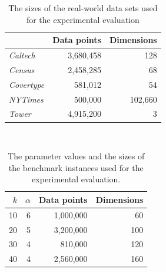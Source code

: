%
\begin{table}
	\begin{center}%
	\caption{The sizes of the real-world data sets used for the experimental evaluation}
	\label{tab:real-world-datasets-overview}
	\begin{tabular}{lrr}
		\toprule
        
		    & Data points
		    & Dimensions
            \\
		\midrule
		\textit{Caltech}
    		& 3,680,458
    		& 128
    		\\
		\textit{Census}
    		& 2,458,285
    		& 68
    		\\
	    \textit{Covertype}
    	    & 581,012
    		& 54
    		\\
	    \textit{NYTimes}
    	    & 500,000
    		& 102,660
    		\\
        \textit{Tower}
            & 4,915,200
    		& 3
    		\\
		\bottomrule
	\end{tabular}\\
	\end{center}
\end{table}



%
\begin{table}
	\begin{center}%
	\caption{The parameter values and the sizes of the benchmark instances used for the experimental evaluation.}
	\label{tab:benchmark-instances-overview}
	\begin{tabular}{rrrr}
		\toprule
        $k$
		    & $\alpha$
		    & Data points
		    & Dimensions
            \\
		\midrule
        10
    		& 6
    		& 1,000,000
    		& 60
    		\\
        20
    		& 5
    		& 3,200,000
    		& 100
    		\\
        30
    		& 4
    		& 810,000
    		& 120
    		\\
        40
    		& 4
    		& 2,560,000
    		& 160
    		\\
		\bottomrule
	\end{tabular}\\
	\end{center}
\end{table}


